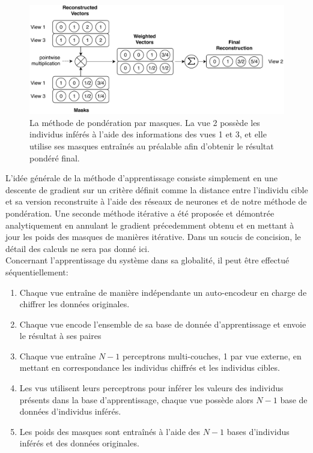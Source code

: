 \documentclass[a4paper]{article}
\begin{document}
	\begin{figure}[H]
		\centering
		\includegraphics[width=\textwidth]{img/mwm.pdf}
        \caption{La méthode de pondération par masques. La vue 2 possède les individus inférés à l'aide des informations des vues 1 et 3, et elle utilise ses masques entraînés au préalable afin d'obtenir le résultat pondéré final.}
\label{fig:sum_mwm}
	\end{figure}

    L'idée générale de la méthode d'apprentissage consiste simplement en une descente de gradient sur un critère définit comme la distance entre l'individu cible et sa version reconstruite à l'aide des réseaux de neurones et de notre méthode de pondération. Une seconde méthode itérative a été proposée et démontrée analytiquement en annulant le gradient précedemment obtenu et en mettant à jour les poids des masques de manières itérative. Dans un soucis de concision, le détail des calculs ne sera pas donné ici. \\

    Concernant l'apprentissage du système dans sa globalité, il peut \^{e}tre effectué séquentiellement:
    \begin{enumerate}
        \item Chaque vue entraîne de manière indépendante un auto-encodeur en charge de chiffrer les données originales.
        \item Chaque vue encode l'ensemble de sa base de donnée d'apprentissage et envoie le résultat à ses paires
        \item Chaque vue entraîne $N-1$ perceptrons multi-couches, 1 par vue externe, en mettant en correspondance les individus chiffrés et les individus cibles.
        \item Les vus utilisent leurs perceptrons pour inférer les valeurs des individus présents dans la base d'apprentissage, chaque vue possède alors $N-1$ base de données d'individus inférés.
        \item Les poids des masques sont entraînés à l'aide des $N-1$ bases d'individus inférés et des données originales.\\
    \end{enumerate}
\end{document}
